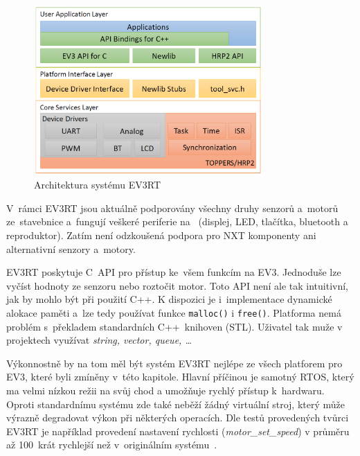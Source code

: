 \begin{figure}[h]
	\centering
	\includegraphics[width=330px]{images/ev3rt-architecture.png}
	\caption[Architektura systému EV3RT]{Architektura systému EV3RT\protect\footnotemark}
	\label{robotc_language-variants}
\end{figure}


V~rámci EV3RT jsou aktuálně podporovány všechny druhy senzorů a~motorů ze~stavebnice \legoEV{} a~fungují veškeré periferie na~ (displej, LED, tlačítka, bluetooth a reproduktor). 
Zatím není odzkoušená podpora pro NXT komponenty ani alternativní senzory a~motory. 

EV3RT poskytuje C~API pro přístup ke~všem funkcím na EV3. 
Jednoduše lze vyčíst hodnoty ze senzoru nebo roztočit motor.
Toto API není ale tak intuitivní, jak by mohlo být při použití C++.
K dispozici je i~implementace dynamické alokace paměti a~lze tedy používat funkce \verb|malloc()| i \verb|free()|.
Platforma nemá problém s~překladem standardních C++~knihoven (STL).
Uživatel tak muže v projektech využívat {\it string, vector, queue, \dots}

Výkonnostně by na tom měl být systém EV3RT nejlépe ze všech platforem pro EV3, které byli zmíněny v~této kapitole. 
Hlavní příčinou je samotný RTOS, který ma velmi nízkou režii na svůj chod a umožňuje rychlý přístup k~hardwaru. %
Oproti standardnímu \lego{} systému zde také neběží žádný virtuální stroj, který může výrazně degradovat výkon při některých operacích. 
Dle testů provedených tvůrci EV3RT je například provedení nastavení rychlosti ({\it motor\_set\_speed}) v průměru až 100~krát rychlejší než v~originálním systému~\cite{legoProgramingPlatform_EV3RT-paper}. \\
 
